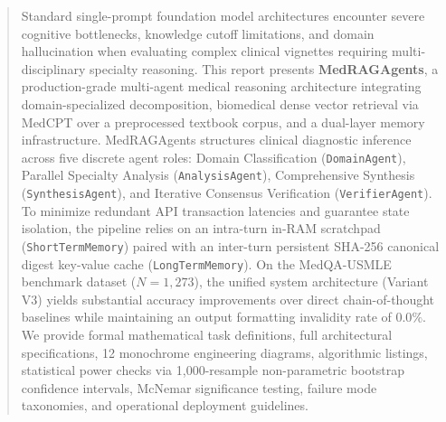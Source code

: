 \documentclass[11pt,a4paper]{article}
\begin{document}
\begin{titlepage}
  \begin{abstract}
  \noindent Standard single-prompt foundation model architectures encounter severe cognitive bottlenecks, knowledge cutoff limitations, and domain hallucination when evaluating complex clinical vignettes requiring multi-disciplinary specialty reasoning. This report presents \textbf{MedRAGAgents}, a production-grade multi-agent medical reasoning architecture integrating domain-specialized decomposition, biomedical dense vector retrieval via MedCPT over a preprocessed textbook corpus, and a dual-layer memory infrastructure. MedRAGAgents structures clinical diagnostic inference across five discrete agent roles: Domain Classification (\texttt{DomainAgent}), Parallel Specialty Analysis (\texttt{AnalysisAgent}), Comprehensive Synthesis (\texttt{SynthesisAgent}), and Iterative Consensus Verification (\texttt{VerifierAgent}). To minimize redundant API transaction latencies and guarantee state isolation, the pipeline relies on an intra-turn in-RAM scratchpad (\texttt{ShortTermMemory}) paired with an inter-turn persistent SHA-256 canonical digest key-value cache (\texttt{LongTermMemory}). On the MedQA-USMLE benchmark dataset ($N=1,273$), the unified system architecture (Variant V3) yields substantial accuracy improvements over direct chain-of-thought baselines while maintaining an output formatting invalidity rate of $0.0\%$. We provide formal mathematical task definitions, full architectural specifications, 12 monochrome engineering diagrams, algorithmic listings, statistical power checks via 1,000-resample non-parametric bootstrap confidence intervals, McNemar significance testing, failure mode taxonomies, and operational deployment guidelines.
  \end{abstract}
  
\end{titlepage}

\newpage
\tableofcontents
\clearpage
\listoffigures
\listoftables
\clearpage

\clearpage

\clearpage

\clearpage

\clearpage

\clearpage

\clearpage

\clearpage

\clearpage

\clearpage

\clearpage

\clearpage

\clearpage

\clearpage

\clearpage

\clearpage


\clearpage


\end{document}
